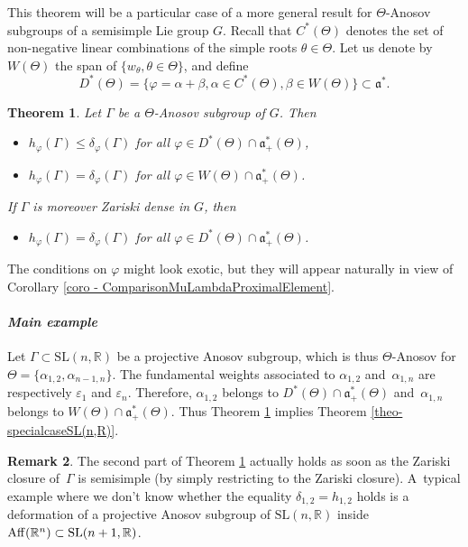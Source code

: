 \documentclass[11pt]{article}
\numberwithin{equation}{section}
\newtheorem{theo}{Theorem}[section]
\theoremstyle{definition}
\newtheorem{rmk}[theo]{Remark}
\newcommand{\R}{\mathbb{R}}
\newcommand{\SL}{\mathrm{SL}}
\newcommand{\fa}{\mathfrak{a}}
\let\epsilon\varepsilon
\let\phi\varphi
\let\G\Gamma
\begin{document}
This theorem will be a particular case of a more general result for $\Theta$-Anosov subgroups of a semisimple Lie group $G$. Recall that $C^*(\Theta)$ denotes the set of non-negative linear combinations of the simple roots $\theta \in \Theta$. Let us denote by $W(\Theta)$ the span of $\{w_\theta, \theta \in \Theta\}$, and define
\[D^*(\Theta) = \{\phi = \alpha + \beta, \alpha \in C^*(\Theta), \beta \in W(\Theta)\} \subset \fa^*.\]

\begin{theo} \label{theo-GeneralComparisonEntropyCriticalExponent}
Let $\Gamma$ be a $\Theta$-Anosov subgroup of $G$. Then
\begin{itemize}
\item $h_\phi(\Gamma) \leq \delta_\phi(\Gamma)$ for all $\phi\in D^*(\Theta)\cap \fa_+^*(\Theta)$,
\item $h_\phi(\Gamma) = \delta_\phi(\Gamma)$ for all $\phi \in W(\Theta)\cap \fa_+^*(\Theta)$.
\end{itemize}

If $\G$ is moreover Zariski dense in $G$, then
\begin{itemize}
\item $h_\phi(\G) =\delta_\phi(\G)$ for all $\phi \in D^*(\Theta)\cap \fa_+^*(\Theta)$.
\end{itemize}
\end{theo}

The conditions on $\phi$ might look exotic, but they will appear naturally in view of Corollary \ref{coro - ComparisonMuLambdaProximalElement}.

\paragraph{{\it Main example}} Let $\G \subset \SL(n,\R)$ be a projective Anosov subgroup, which is thus $\Theta$\nobreakdash-Anosov for $\Theta=\{\alpha_{1,2}, \alpha_{n-1,n}\}$. The fundamental weights associated to $\alpha_{1,2}$ and~$\alpha_{1,n}$ are respectively $\epsilon_1$ and $\epsilon_n$. Therefore, $\alpha_{1,2}$ belongs to
$D^*(\Theta)\cap \fa_+^*(\Theta)$ and~$\alpha_{1,n}$ belongs to $W(\Theta)\cap \fa_+^*(\Theta)$. Thus Theorem \ref{theo-GeneralComparisonEntropyCriticalExponent} implies Theorem \ref{theo-specialcaseSL(n,R)}.

\begin{rmk}
The second part of Theorem \ref{theo-GeneralComparisonEntropyCriticalExponent} actually holds as soon as the Zariski closure of\, $\G$ is semisimple (by simply restricting to the Zariski closure). A~typical example where we don't know whether the equality $\delta_{1,2} = h_{1,2}$ holds is a defor\-mation of a projective Anosov subgroup of $\SL(n,\R)$ inside $\mathrm{Aff}(\R^n) \subset \SL(n+\nobreak1,\R)$.
\end{rmk}
\end{document}
